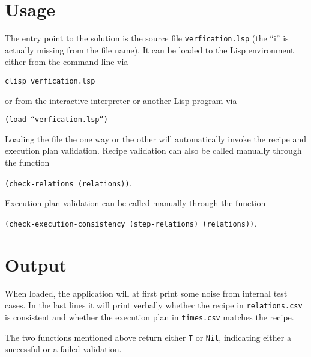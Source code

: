   \section{Usage}
    
    The entry point to the solution is the source file \texttt{verfication.lsp}
    (the ``i'' is actually missing from the file name). It can be loaded to the
    Lisp environment either from the command line via
    
    \begin{center}
        \texttt{clisp verfication.lsp}
    \end{center}
    
    or from the interactive interpreter or another Lisp program via
    
    \begin{center}\texttt{(load ``verfication.lsp'')}\end{center}
    
    Loading the file the one way or the other will automatically invoke the recipe
    and execution plan validation. Recipe validation can also be called manually
    through the function 
    
    \begin{center}\texttt{(check-relations (relations))}.\end{center}
    
    Execution plan
    validation can be called manually through the function
    
    \begin{center}\texttt{(check-execution-consistency (step-relations)
    (relations))}.\end{center}
  
  \section{Output}
    
    When loaded, the application will at first print some noise from internal
    test cases.
    In the last lines it will print verbally whether the recipe in
    \texttt{relations.csv} is consistent and whether the execution plan in
    \texttt{times.csv} matches the recipe.
    
    The two functions mentioned above return either \texttt{T} or \texttt{Nil},
    indicating either a successful or a failed validation.
